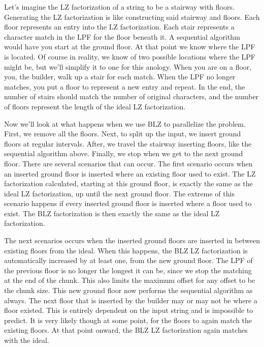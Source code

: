 Let's imagine the LZ factorization of a string to be a stairway with floors.
Generating the LZ factorization is like constructing said stairway and floors.
Each floor represents an entry into the LZ factorization.
Each stair represents a character match in the LPF for the floor beneath it.
A sequential algorithm would have you start at the ground floor.
At that point we know where the LPF is located.
Of course in reality, we know of two possible locations where the LPF might be, but we'll simplify it to one for this anology.
When you are on a floor, you, the builder, walk up a stair for each match.
When the LPF no longer matches, you put a floor to represent a new entry and repeat.
In the end, the number of stairs should match the number of original characters, and the number of floors represent the length of the ideal LZ factorization.

Now we'll look at what happens when we use BLZ to parallelize the problem.
First, we remove all the floors.
Next, to split up the input, we insert ground floors at regular intervals.
After, we travel the stairway inserting floors, like the sequential algorithm above.
Finally, we stop when we get to the next ground floor.
There are several scenarios that can occur.
The first scenario occurs when an inserted ground floor is inserted where an existing floor used to exist.
The LZ factorization calculated, starting at this ground floor, is exactly the same as the ideal LZ factorization, up until the next ground floor.
The extreme of this scenario happens if every inserted ground floor is inserted where a floor used to exist.
The BLZ factorization is then exactly the same as the ideal LZ factorization.

The next scenarios occurs when the inserted ground floors are inserted in between existing floors from the ideal.
When this happens, the BLZ LZ factorization is automatically increased by at least one, from the new ground floor.
The LPF of the previous floor is no longer the longest it can be, since we stop the matching at the end of the chunk.
This also limits the maximum offset for any offset to be the chunk size.
This new ground floor now performs the sequential algorithm as always.
The next floor that is inserted by the builder may or may not be where a floor existed.
This is entirely dependent on the input string and is impossible to predict.
It is very likely though at some point, for the floors to again match the existing floors.
At that point onward, the BLZ LZ factorization again matches with the ideal.

